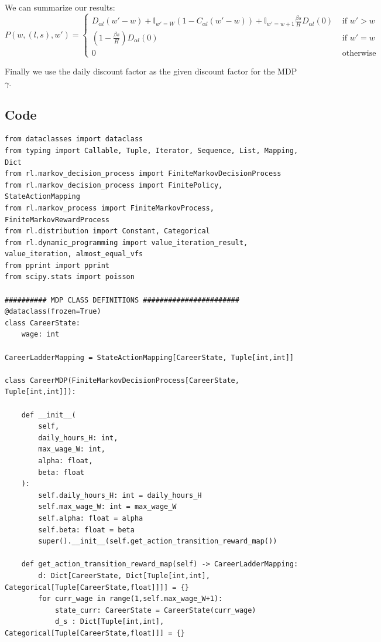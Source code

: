 \documentclass{article}[12pt]
\begin{document}
We can summarize our results:
$$ P(w,(l,s), w') = \begin{cases}D_{\alpha l}(w'-w) + \mathbb{I}_{w' = W}(1-C_{\alpha l}(w'-w)) +  \mathbb{I}_{w' = w+1}\frac{\beta s}{H}D_{\alpha l}(0)  &\text{ if $w'>w$}\\ (1-\frac{\beta s}{H})D_{\alpha l}(0)  &\text{ if $w'=w$}\\ 0 &\text{ otherwise} \end{cases}$$

Finally we use the daily discount factor as the given discount factor for the MDP $\gamma$.

\subsection{Code}
\begin{lstlisting}
from dataclasses import dataclass
from typing import Callable, Tuple, Iterator, Sequence, List, Mapping, Dict
from rl.markov_decision_process import FiniteMarkovDecisionProcess
from rl.markov_decision_process import FinitePolicy, StateActionMapping
from rl.markov_process import FiniteMarkovProcess, FiniteMarkovRewardProcess
from rl.distribution import Constant, Categorical
from rl.dynamic_programming import value_iteration_result, value_iteration, almost_equal_vfs
from pprint import pprint
from scipy.stats import poisson

########## MDP CLASS DEFINITIONS #######################
@dataclass(frozen=True)
class CareerState:
    wage: int

CareerLadderMapping = StateActionMapping[CareerState, Tuple[int,int]]

class CareerMDP(FiniteMarkovDecisionProcess[CareerState, Tuple[int,int]]):

    def __init__(
        self,
        daily_hours_H: int,
        max_wage_W: int,
        alpha: float,
        beta: float
    ):
        self.daily_hours_H: int = daily_hours_H
        self.max_wage_W: int = max_wage_W
        self.alpha: float = alpha
        self.beta: float = beta
        super().__init__(self.get_action_transition_reward_map())

    def get_action_transition_reward_map(self) -> CareerLadderMapping:
        d: Dict[CareerState, Dict[Tuple[int,int], Categorical[Tuple[CareerState,float]]]] = {}
        for curr_wage in range(1,self.max_wage_W+1):
            state_curr: CareerState = CareerState(curr_wage)
            d_s : Dict[Tuple[int,int], Categorical[Tuple[CareerState,float]]] = {}
            

\end{lstlisting}
\end{document}
